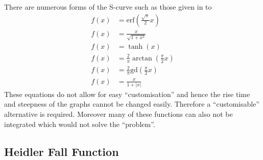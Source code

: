 There are numerous forms of the S-curve such as those given in  to 
\begin{subequations}
    \label{eqn:scurve}
    \begin{align}
        f(x) & = \mathrm{erf} \left ( \frac{\sqrt{\pi}}{2}x \right ) \label{eqn:erf} \\
        f(x) & = \frac{x}{\sqrt{1+x^2}} \label{eqn:sqrt} \\
        f(x) & = \tanh(x) \label{eqn:tanh} \\
        f(x) & = \frac{2}{\pi}\arctan \left ( \frac{\pi}{2}x \right ) \label{eqn:atan} \\
        f(x) & = \frac{2}{\pi}\mathrm{gd} \left ( \frac{\pi}{2}x \right ) \label{eqn:gd} \\
        f(x) & = \frac{x}{1+|x|} \label{eqn:abs}
    \end{align}
\end{subequations}
These equations do not allow for easy ``customisation'' and hence the rise time and steepness of the graphs cannot be changed easily. Therefore a ``customisable'' alternative is required. Moreover many of these functions can also not be integrated which would not solve the ``problem''.



\subsection{Heidler Fall Function}
\label{sub:approx_heidler_fall_function}

